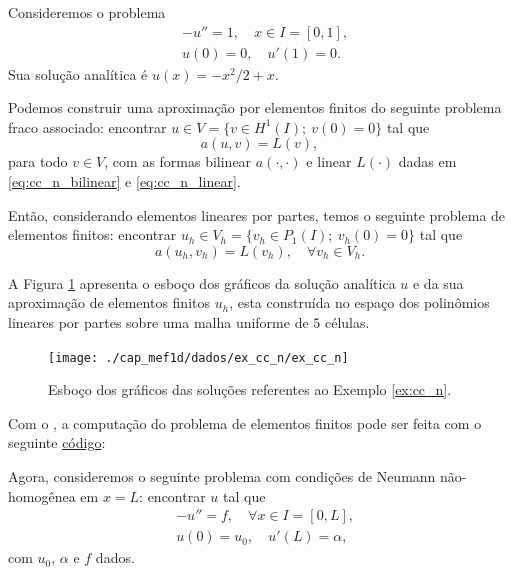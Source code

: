 \begin{ex}\label{ex:cc_n}
  Consideremos o problema
  \begin{align}
    &-u'' = 1,\quad x\in I=[0,1],\label{eq:ex_cc_n_eq}\\
    &u(0) = 0,\quad u'(1) = 0.\label{eq:ex_cc_n_bc}
  \end{align}
Sua solução analítica é $u(x) = -x^2/2+x$. 

Podemos construir uma aproximação por elementos finitos do seguinte problema fraco associado: encontrar $u\in V=\{v\in H^1(I);~v(0)=0\}$ tal que
\begin{equation}
  a(u, v) = L(v),
\end{equation}
para todo $v\in V$, com as formas bilinear $a(\cdot, \cdot)$ e linear $L(\cdot)$ dadas em \eqref{eq:cc_n_bilinear} e \eqref{eq:cc_n_linear}.

Então, considerando elementos lineares por partes, temos o seguinte problema de elementos finitos: encontrar $u_h\in V_h=\{v_h\in P_1(I);~v_h(0)=0\}$ tal que
\begin{equation}
  a(u_h, v_h) = L(v_h),\quad\forall v_h\in V_h.
\end{equation}

A Figura \ref{fig:ex_cc_n} apresenta o esboço dos gráficos da solução analítica $u$ e da sua aproximação de elementos finitos $u_h$, esta construída no espaço dos polinômios lineares por partes sobre uma malha uniforme de $5$ células.

\begin{figure}[h!]
  \centering
  \texttt{[image: ./cap\_mef1d/dados/ex\_cc\_n/ex\_cc\_n]}
  \caption{Esboço dos gráficos das soluções referentes ao Exemplo \ref{ex:cc_n}.}
  \label{fig:ex_cc_n}
\end{figure}

\ifispython
Com o \fenics, a computação do problema de elementos finitos pode ser feita com o seguinte \href{https://github.com/phkonzen/notas/blob/master/src/MetodoElementosFinitos/cap_mef1d/dados/ex_cc_n/ex_cc_n.py}{código}:

\fi
\end{ex}

Agora, consideremos o seguinte problema com condições de Neumann não-homogênea em $x=L$: encontrar $u$ tal que
\begin{align}
  &-u'' = f,\quad \forall x\in I=[0, L],\label{eq:cc_n2_eq}\\
  &u(0) = u_0,\quad u'(L) = \alpha,\label{eq:cc_n2_bc}
\end{align}
com $u_0$, $\alpha$ e $f$ dados.

